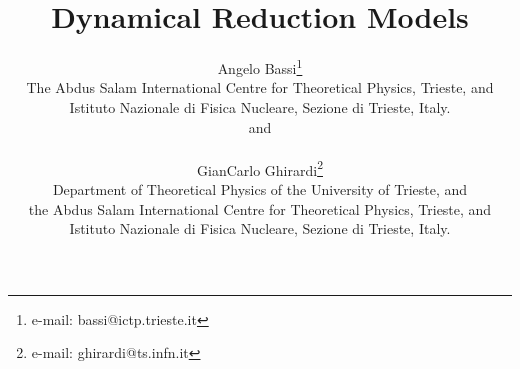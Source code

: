 \documentclass[10pt,a4paper]{article}
\begin{document}
\title{\bf Dynamical Reduction Models}

\author{Angelo Bassi\footnote{e-mail: bassi@ictp.trieste.it}\\
{\small The Abdus Salam International Centre for
Theoretical Physics, Trieste, and}\\{\small Istituto Nazionale di Fisica
Nucleare, Sezione di Trieste, Italy.}\\ and\\
\\ GianCarlo Ghirardi\footnote{e-mail: ghirardi@ts.infn.it}\\
{\small Department of Theoretical Physics of the University of
Trieste, and}\\ {\small the Abdus Salam International Centre for
Theoretical Physics, Trieste, and}\\{\small Istituto Nazionale di
Fisica Nucleare, Sezione di Trieste, Italy.}}

\date{}

\maketitle
\end{document}
